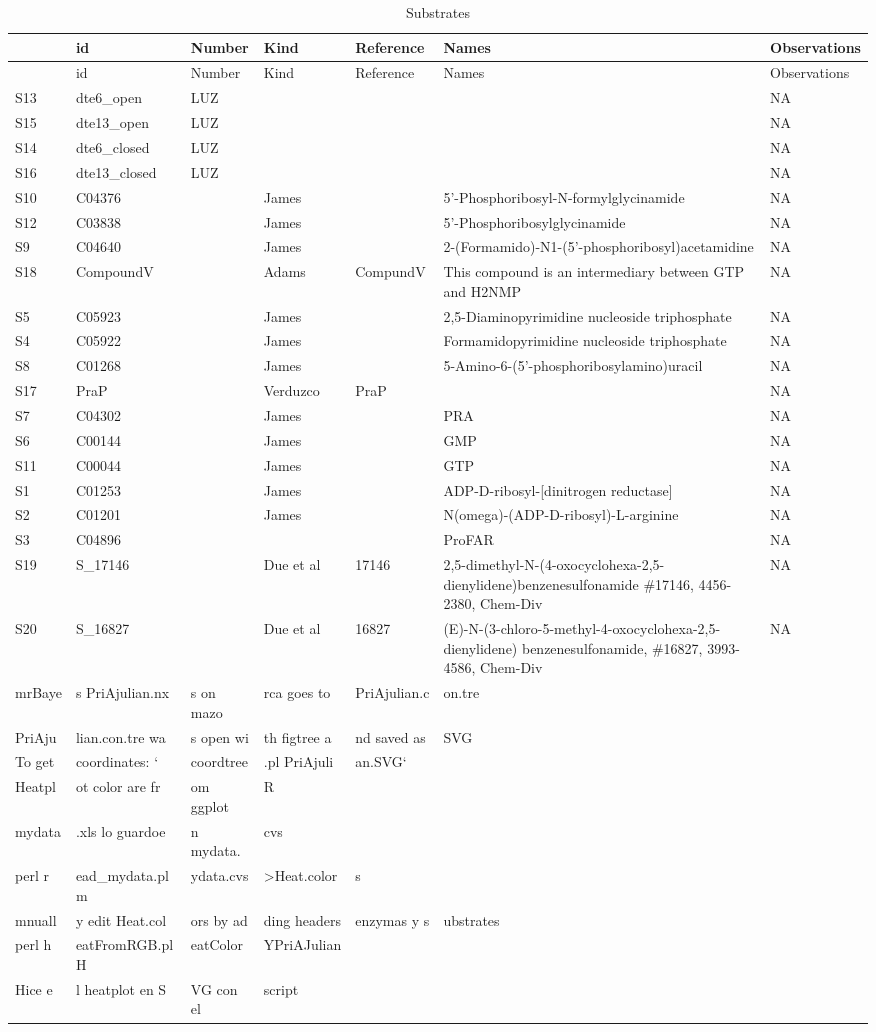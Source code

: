 \documentclass[12pt,twoside]{reedthesis}
\begin{document}
  \begin{longtable}[c]{@{}lllllll@{}}
  \caption{Substrates \label{tab:substrates}}\tabularnewline
  \toprule
  & id & Number & Kind & Reference & Names & Observations\tabularnewline
  \midrule
  \endfirsthead
  \toprule
  & id & Number & Kind & Reference & Names & Observations\tabularnewline
  \midrule
  \endhead
  S13 & dte6\_open & LUZ & & & & NA\tabularnewline
  S15 & dte13\_open & LUZ & & & & NA\tabularnewline
  S14 & dte6\_closed & LUZ & & & & NA\tabularnewline
  S16 & dte13\_closed & LUZ & & & & NA\tabularnewline
  S10 & C04376 & & James & & 5'-Phosphoribosyl-N-formylglycinamide &
  NA\tabularnewline
  S12 & C03838 & & James & & 5'-Phosphoribosylglycinamide &
  NA\tabularnewline
  S9 & C04640 & & James & &
  2-(Formamido)-N1-(5'-phosphoribosyl)acetamidine & NA\tabularnewline
  S18 & CompoundV & & Adams & CompundV & This compound is an intermediary
  between GTP and H2NMP & NA\tabularnewline
  S5 & C05923 & & James & & 2,5-Diaminopyrimidine nucleoside triphosphate
  & NA\tabularnewline
  S4 & C05922 & & James & & Formamidopyrimidine nucleoside triphosphate &
  NA\tabularnewline
  S8 & C01268 & & James & & 5-Amino-6-(5'-phosphoribosylamino)uracil &
  NA\tabularnewline
  S17 & PraP & & Verduzco & PraP & & NA\tabularnewline
  S7 & C04302 & & James & & PRA & NA\tabularnewline
  S6 & C00144 & & James & & GMP & NA\tabularnewline
  S11 & C00044 & & James & & GTP & NA\tabularnewline
  S1 & C01253 & & James & & ADP-D-ribosyl-{[}dinitrogen reductase{]} &
  NA\tabularnewline
  S2 & C01201 & & James & & N(omega)-(ADP-D-ribosyl)-L-arginine &
  NA\tabularnewline
  S3 & C04896 & & & & ProFAR & NA\tabularnewline
  S19 & S\_17146 & & Due et al & 17146 &
  2,5-dimethyl-N-(4-oxocyclohexa-2,5-dienylidene)benzenesulfonamide
  \#17146, 4456-2380, Chem-Div & NA\tabularnewline
  S20 & S\_16827 & & Due et al & 16827 &
  (E)-N-(3-chloro-5-methyl-4-oxocyclohexa-2,5-dienylidene)
  benzenesulfonamide, \#16827, 3993-4586, Chem-Div & NA\tabularnewline
  mrBaye & s PriAjulian.nx & s on mazo & rca goes to & PriAjulian.c &
  on.tre &\tabularnewline
  PriAju & lian.con.tre wa & s open wi & th figtree a & nd saved as & SVG
  &\tabularnewline
  To get & coordinates: ` & coordtree & .pl PriAjuli & an.SVG` &
  &\tabularnewline
  Heatpl & ot color are fr & om ggplot & R & & &\tabularnewline
  mydata & .xls lo guardoe & n mydata. & cvs & & &\tabularnewline
  perl r & ead\_mydata.pl m & ydata.cvs & \textgreater{}Heat.color & s &
  &\tabularnewline
  mnuall & y edit Heat.col & ors by ad & ding headers & enzymas y s &
  ubstrates &\tabularnewline
  perl h & eatFromRGB.pl H & eatColor & YPriAJulian & & &\tabularnewline
  Hice e & l heatplot en S & VG con el & script & & &\tabularnewline
  \bottomrule
  \end{longtable}
  
\end{document}
